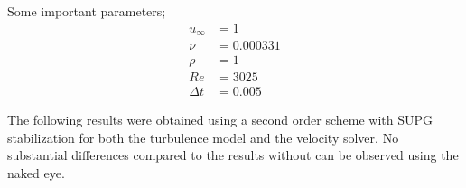 \documentclass[twoside, 11pt, a4paper]{article}
\begin{document}
Some important parameters;
\[
    \begin{split}
        u_{\infty} &= 1 \\
        \nu &= 0.000331 \\
        \rho &= 1 \\
        Re &= 3025 \\
        \Delta t &= 0.005
    \end{split}
\]

The following results were obtained using a second order scheme with SUPG stabilization for both the
turbulence model and the velocity solver. No substantial differences compared to the results without
can be observed using the naked eye.
\newpage
\begin{figure}[h]
    \begin{center}

\end{center}
\end{figure}
\end{document}
